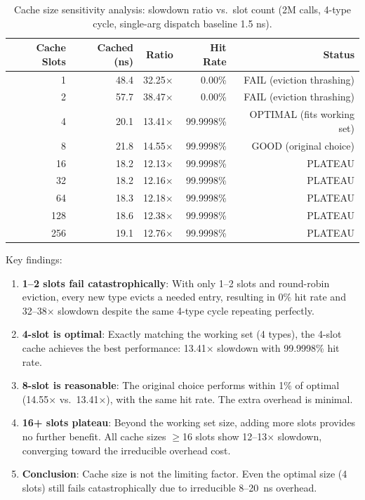 \documentclass[sigplan,final]{acmart}
\begin{document}
\begin{table}[h]
\centering
\caption{Cache size sensitivity analysis: slowdown ratio vs.~slot count (2M calls, 4-type cycle, single-arg dispatch baseline 1.5 ns).}
\label{tab:cache-size}
\begin{tabular}{@{}rrrrr@{}}
\toprule
\textbf{Cache Slots} & \textbf{Cached (ns)} & \textbf{Ratio} & \textbf{Hit Rate} & \textbf{Status} \\
\midrule
1   & 48.4  & 32.25× & 0.00\%     & FAIL (eviction thrashing) \\
2   & 57.7  & 38.47× & 0.00\%     & FAIL (eviction thrashing) \\
4   & 20.1  & 13.41× & 99.9998\%  & OPTIMAL (fits working set) \\
8   & 21.8  & 14.55× & 99.9998\%  & GOOD (original choice) \\
16  & 18.2  & 12.13× & 99.9998\%  & PLATEAU \\
32  & 18.2  & 12.16× & 99.9998\%  & PLATEAU \\
64  & 18.3  & 12.18× & 99.9998\%  & PLATEAU \\
128 & 18.6  & 12.38× & 99.9998\%  & PLATEAU \\
256 & 19.1  & 12.76× & 99.9998\%  & PLATEAU \\
\bottomrule
\end{tabular}
\end{table}

Key findings:

\begin{enumerate}
  \item \textbf{1--2 slots fail catastrophically}: With only 1--2 slots and round-robin eviction,
    every new type evicts a needed entry, resulting in 0\% hit rate and 32--38× slowdown despite
    the same 4-type cycle repeating perfectly.

  \item \textbf{4-slot is optimal}: Exactly matching the working set (4 types), the 4-slot cache
    achieves the best performance: 13.41× slowdown with 99.9998\% hit rate.

  \item \textbf{8-slot is reasonable}: The original choice performs within 1\% of optimal
    (14.55× vs.~13.41×), with the same hit rate. The extra overhead is minimal.

  \item \textbf{16+ slots plateau}: Beyond the working set size, adding more slots provides no
    further benefit. All cache sizes $\geq$16 slots show 12--13× slowdown, converging toward the
    irreducible overhead cost.

  \item \textbf{Conclusion}: Cache size is not the limiting factor. Even the optimal size (4 slots)
    still fails catastrophically due to irreducible 8--20~ns overhead.
\end{enumerate}
\end{document}
